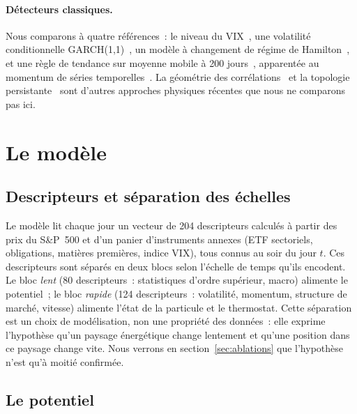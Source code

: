 \documentclass[11pt,a4paper]{article}
\begin{document}
\paragraph{Détecteurs classiques.} Nous comparons à quatre références~: le niveau du VIX~\cite{whaley2000}, une volatilité conditionnelle GARCH(1,1)~\cite{bollerslev1986}, un modèle à changement de régime de Hamilton~\cite{hamilton1989}, et une règle de tendance sur moyenne mobile à 200 jours~\cite{faber2007}, apparentée au momentum de séries temporelles~\cite{moskowitz2012}. La géométrie des corrélations~\cite{sandhu2016} et la topologie persistante~\cite{topological2025} sont d'autres approches physiques récentes que nous ne comparons pas ici.

\section{Le modèle}
\label{sec:model}

\subsection{Descripteurs et séparation des échelles}

Le modèle lit chaque jour un vecteur de 204 descripteurs calculés à partir des prix du S\&P~500 et d'un panier d'instruments annexes (ETF sectoriels, obligations, matières premières, indice VIX), tous connus au soir du jour $t$. Ces descripteurs sont séparés en deux blocs selon l'échelle de temps qu'ils encodent. Le bloc \emph{lent} (80 descripteurs~: statistiques d'ordre supérieur, macro) alimente le potentiel~; le bloc \emph{rapide} (124 descripteurs~: volatilité, momentum, structure de marché, vitesse) alimente l'état de la particule et le thermostat. Cette séparation est un choix de modélisation, non une propriété des données~: elle exprime l'hypothèse qu'un paysage énergétique change lentement et qu'une position dans ce paysage change vite. Nous verrons en section~\ref{sec:ablations} que l'hypothèse n'est qu'à moitié confirmée.

\subsection{Le potentiel}
\end{document}
